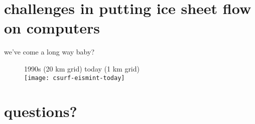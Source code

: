\documentclass[hide notes,intlimits]{beamer}
\begin{document}
\section[challenges]{challenges in putting ice sheet flow on computers}

\begin{frame}{we've come a long way baby?}
  \vspace{-.25cm}
  \begin{figure}
    1990s (20 km grid) \hspace{1.75cm} today (1 km grid)\\
    \texttt{[image: csurf-eismint-today]}
  \end{figure}
\end{frame}


\section{questions?}
\end{document}
